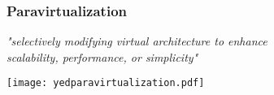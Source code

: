\begin{frame}
\frametitle{Paravirtualization}

\begin{center}
  \textit{"selectively modifying virtual architecture to enhance\\
scalability, performance, or simplicity"}
\end{center}

\begin{center}
  \texttt{[image: yedparavirtualization.pdf]}
\end{center}

\end{frame}
